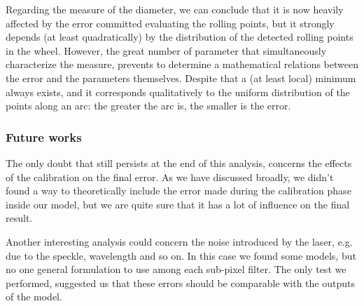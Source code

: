 Regarding the measure of the diameter, we can conclude that it is now heavily affected by the error committed evaluating the rolling points, but it strongly depends (at least quadratically) by the distribution of the detected rolling points in the wheel. However, the great number of parameter that simultaneously characterize the measure, prevents to determine a mathematical relations between the error and the parameters themselves. Despite that a (at least local) minimum always exists, and it corresponds qualitatively to the uniform distribution of the points along an arc: the greater the arc is, the smaller is the error.

\subsubsection{Future works}
The only doubt that still persists at the end of this analysis, concerns the effects of the calibration on the final error. As we have discussed broadly, we didn't found a way to theoretically include the error made during the calibration phase inside our model, but we are quite sure that it has a lot of influence on the final result. 

Another interesting analysis could concern the noise introduced by the laser, e.g. due to the speckle, wavelength and so on. In this case we found some models, but no one general formulation to use among each sub-pixel filter. The only test we performed, suggested us that these errors should be comparable with the outputs of the model.

